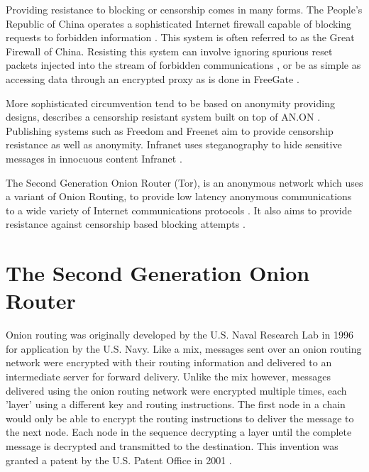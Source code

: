 \documentclass{ecuthesis}
\begin{document}
Providing resistance to blocking or censorship comes in many forms. The People's
Republic of China operates a sophisticated Internet firewall capable of blocking
requests to forbidden information \parencite{The-OpenNet-Initiative:2009uq}.
This system is often referred to as the Great Firewall of China. Resisting this
system can involve ignoring spurious reset packets injected into the stream of
forbidden communications \parencite{springerlink:10.1007/11957454_2}, or be as
simple as accessing data through an encrypted proxy as is done in FreeGate
\parencite{Smart:2008kx}. 

More sophisticated circumvention tend to be based on anonymity providing
designs, \textcite{Kopsell:2004:ABR:1029179.1029197} describes a censorship
resistant system built on top of AN.ON
\parencite{springerlink:10.1007/3-540-44702-4_7}. Publishing systems such as
Freedom \parencite{Goldberg:1999p2231} and Freenet \parencite{Clarke:2001p2435}
aim to provide censorship resistance as well as anonymity. Infranet uses
steganography to hide sensitive messages in innocuous content Infranet
\parencite{Feamster:2002p307}.

The Second Generation Onion Router (Tor), is an anonymous network which uses a
variant of Onion Routing, to provide low latency anonymous communications to a
wide variety of Internet communications protocols
\parencite{Dingledine:2004p314}. It also aims to provide resistance against
censorship based blocking attempts \parencite{Dingledine:2008p1542}.

\section{The Second Generation Onion Router}

Onion routing was originally developed by the U.S. Naval Research Lab in 1996
\parencite{Goldschlag:1996wy} for application by the U.S. Navy. Like a mix,
messages sent over an onion routing network were encrypted with their routing
information and delivered to an intermediate server for forward delivery.
Unlike the mix however, messages delivered using the onion routing network were
encrypted multiple times, each 'layer' using a different key and routing
instructions. The first node in a chain would only be able to encrypt the
routing instructions to deliver the message to the next node. Each node in the
sequence decrypting a layer until the complete message is decrypted and
transmitted to the destination. This invention was granted a patent by the U.S.
Patent Office in 2001 \parencite{Michael:2001}.
\end{document}
